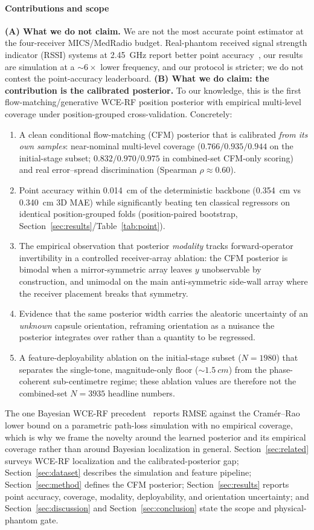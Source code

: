 \paragraph*{Contributions and scope}
\textbf{(A) What we do not claim.} We are not the most accurate point estimator at
the four-receiver MICS/MedRadio budget. Real-phantom received signal strength
indicator (RSSI) systems at \SI{2.45}{GHz} report better point
accuracy~\cite{hasnain2026,hasnain2024}, our results are simulation at a ${\sim}6\times$
lower frequency, and our protocol is stricter; we do not contest the
point-accuracy leaderboard. \textbf{(B) What we do claim: the contribution is
the calibrated posterior.}
To our knowledge, this is the first flow-matching/generative WCE-RF position
posterior with empirical multi-level coverage under position-grouped
cross-validation. Concretely:
\begin{enumerate}
\item A clean conditional flow-matching (CFM) posterior that is calibrated
\emph{from its own samples}: near-nominal multi-level coverage
($0.766/0.935/0.944$ on the initial-stage subset; $0.832/0.970/0.975$ in
combined-set CFM-only scoring) and real error--spread discrimination (Spearman
$\rho\approx0.60$).
\item Point accuracy within \SI{0.014}{cm} of the deterministic backbone
(\SI{0.354}{cm} vs \SI{0.340}{cm} 3D MAE) while significantly beating ten
classical regressors on identical position-grouped folds (position-paired
bootstrap, Section~\ref{sec:results}/Table~\ref{tab:point}).
\item The empirical observation that posterior \emph{modality} tracks
forward-operator invertibility in a controlled receiver-array ablation: the CFM
posterior is bimodal when a mirror-symmetric array leaves $y$ unobservable by
construction, and unimodal on the main anti-symmetric side-wall array where the receiver
placement breaks that symmetry.
\item Evidence that the same posterior width carries the aleatoric uncertainty of
an \emph{unknown} capsule orientation, reframing orientation as a nuisance the
posterior integrates over rather than a quantity to be regressed.
\item A feature-deployability ablation on the initial-stage subset ($N=1980$)
that separates
the single-tone, magnitude-only floor (${\sim}\SI{1.5}{cm}$) from the
phase-coherent sub-centimetre regime; these ablation values are therefore not
the combined-set $N=3935$ headline numbers.
\end{enumerate}
The one Bayesian WCE-RF precedent~\cite{nadimi2014} reports RMSE against the
Cram\'er--Rao lower bound on a parametric path-loss simulation with no empirical
coverage, which is why we frame the novelty around the learned posterior and its
empirical coverage rather than around Bayesian localization in general.
Section~\ref{sec:related} surveys WCE-RF localization and the calibrated-posterior
gap; Section~\ref{sec:dataset} describes the simulation and feature pipeline;
Section~\ref{sec:method} defines the CFM posterior; Section~\ref{sec:results}
reports point accuracy, coverage, modality, deployability, and orientation
uncertainty; and Section~\ref{sec:discussion} and Section~\ref{sec:conclusion}
state the scope and physical-phantom gate.
